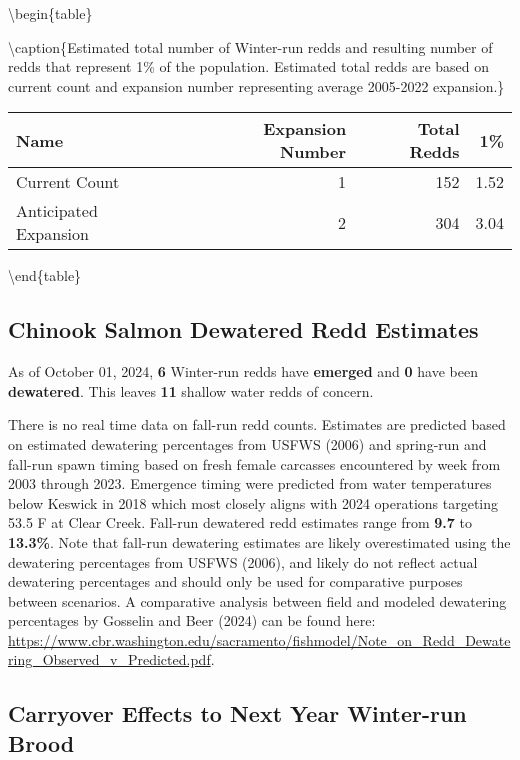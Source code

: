 \documentclass[
]{article}
\begin{document}
\textbackslash begin\{table\}

\textbackslash caption\{\label{tab:unnamed-chunk-5}Estimated total
number of Winter-run redds and resulting number of redds that represent
1\% of the population. Estimated total redds are based on current count
and expansion number representing average 2005-2022 expansion.\}
\centering

\begin{tabular}[t]{l|r|r|r}
\hline
Name & Expansion Number & Total Redds & 1\%\\
\hline
Current Count & 1 & 152 & 1.52\\
\hline
Anticipated Expansion & 2 & 304 & 3.04\\
\hline
\end{tabular}

\textbackslash end\{table\}

\hypertarget{chinook-salmon-dewatered-redd-estimates}{%
\subsection{Chinook Salmon Dewatered Redd
Estimates}\label{chinook-salmon-dewatered-redd-estimates}}

As of October 01, 2024, \textbf{6} Winter-run redds have
\textbf{emerged} and \textbf{0} have been \textbf{dewatered}. This
leaves \textbf{11} shallow water redds of concern.

There is no real time data on fall-run redd counts. Estimates are
predicted based on estimated dewatering percentages from USFWS (2006)
and spring-run and fall-run spawn timing based on fresh female carcasses
encountered by week from 2003 through 2023. Emergence timing were
predicted from water temperatures below Keswick in 2018 which most
closely aligns with 2024 operations targeting 53.5 F at Clear Creek.
Fall-run dewatered redd estimates range from \textbf{9.7} to
\textbf{13.3\%}. Note that fall-run dewatering estimates are likely
overestimated using the dewatering percentages from USFWS (2006), and
likely do not reflect actual dewatering percentages and should only be
used for comparative purposes between scenarios. A comparative analysis
between field and modeled dewatering percentages by Gosselin and Beer
(2024) can be found here:
\url{https://www.cbr.washington.edu/sacramento/fishmodel/Note_on_Redd_Dewatering_Observed_v_Predicted.pdf}.

\hypertarget{carryover-effects-to-next-year-winter-run-brood}{%
\subsection{Carryover Effects to Next Year Winter-run
Brood}\label{carryover-effects-to-next-year-winter-run-brood}}
\end{document}
